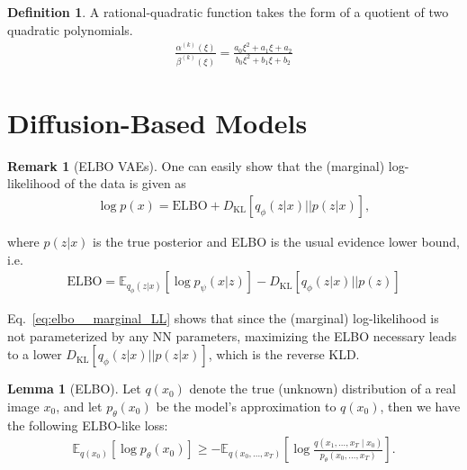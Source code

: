 \documentclass[12pt, a4paper]{article}
\numberwithin{equation}{section}
\theoremstyle{definition}
\theoremstyle{definition}
\newtheorem{defn}[thm]{Definition} %
\newtheorem{lemma}[thm]{Lemma} %
\newtheorem{remark}[thm]{Remark} %
\begin{document}
	\begin{defn}
		A rational-quadratic function takes the form of a quotient of two quadratic polynomials. 
		\begin{align}
			\frac{\alpha^{(k)}\left(\xi\right)}{\beta^{(k)}(\xi)} = \frac{a_0\xi^2 + a_1\xi + a_2}{b_0\xi^2 + b_1\xi + b_2} 
		\end{align}
	\end{defn}	

\newpage 

\section{Diffusion-Based Models}
	
	\begin{remark}[ELBO VAEs]
		One can easily show that the (marginal) log-likelihood of the data is given as
		\cite{cs_231n_lec_13}
		\begin{align}\label{eq:elbo__marginal_LL}
			\log p(x) = \text{ELBO} + D_{\text{KL}}\left[ q_{\phi}(z\vert x) \vert\vert p(z\vert x)\right], 
		\end{align}
		
		\noindent where $p(z\vert x)$ is the true posterior and ELBO is the usual evidence lower bound, i.e.
		\begin{align}
			\text{ELBO} = \mathbb E_{q_{\phi}(z\vert x)}\left[ \log p_{\psi}(x\vert z) \right] - D_{\text{KL}}\left[ q_{\phi}(z\vert x) \vert\vert p(z) \right]
		\end{align}
		
		\noindent Eq.~\eqref{eq:elbo__marginal_LL} shows that since the (marginal) log-likelihood is not parameterized by any NN parameters, maximizing the ELBO necessary leads to a lower $D_{\text{KL}}\left[ q_{\phi}(z\vert x) \vert\vert p(z\vert x)\right]$, which is the reverse KLD. 
		
	\end{remark}

\begin{lemma}[ELBO]
	Let $q(x_{0})$ denote the true (unknown) distribution of a real image $x_{0}$, and let $p_{\theta}(x_{0})$ be the model's approximation to $q(x_{0})$, then we have the following ELBO-like loss: 
	\begin{align}\label{elbo_diffusion_models}
		\mathbb E_{q(x_{0})}\left[\log p_{\theta}(x_{0})\right] \geq -\mathbb E_{q(x_{0}, \dots, x_{T})}\left[\log \frac{q(x_{1}, \dots, x_{T} \mid x_{0})}{p_{\theta}(x_{0}, \dots, x_{T})}\right].    
	\end{align}
\end{lemma}
\end{document}
